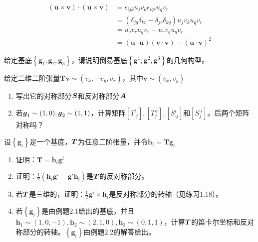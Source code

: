 \begin{exercise}
    \begin{align*}
        \left( \boldsymbol{u}\times \boldsymbol{v} \right) \cdot \left( \boldsymbol{u}\times \boldsymbol{v} \right) &=\epsilon _{ijk}u_jv_k\epsilon _{iqr}u_qv_r\\
        &=\left( \delta _{jq}\delta _{kr}-\delta _{jr}\delta _{kq} \right) u_jv_ku_qv_r\\
        &=u_qv_ru_qv_r-u_rv_qu_qv_r\\
        &=\left( \boldsymbol{u}\cdot \boldsymbol{u} \right) \left( \boldsymbol{v}\cdot \boldsymbol{v} \right) -\left( \boldsymbol{u}\cdot \boldsymbol{v} \right) ^2
    \end{align*}
    \item 给定基底$\left\{ \boldsymbol{g}_1,\boldsymbol{g}_2,\boldsymbol{g}_3 \right\} $，请说明倒易基底$\left\{ \boldsymbol{g}^1,\boldsymbol{g}^2,\boldsymbol{g}^3 \right\} $的几何构型。
    \item 给定二维二阶张量$\boldsymbol{Tv}\sim \left( v_x,-v_y,v_x \right) $，其中$\boldsymbol{v}\sim \left( v_x,v_y \right) $
    \begin{enumerate}
        \item 写出它的对称部分$\boldsymbol{S}$和反对称部分$\boldsymbol{A}$
        \item 若$\boldsymbol{g}_1\sim (1,0),\boldsymbol{g}_2\sim (1,1)$，计算矩阵$\left[ T_{\cdot j}^{i} \right] ,\left[ T_{j}^{\cdot i} \right] ,\left[ S_{\cdot j}^{i} \right] $和$\left[ S_{j}^{\cdot i} \right] $。后两个矩阵对称吗？
    \end{enumerate}
    \item 设$\left\{ \boldsymbol{g}_i \right\} $是一个基底，$\boldsymbol{T}$为任意二阶张量，并令$\boldsymbol{h}_i=\boldsymbol{Tg}_i$
    \begin{enumerate}
        \item 证明：$\boldsymbol{T}=\boldsymbol{h}_i\boldsymbol{g}^i$
        \item 证明：$\frac{1}{2}\left( \boldsymbol{h}_i\boldsymbol{g}^i-\boldsymbol{g}^i\boldsymbol{h}_i \right) $是$\boldsymbol{T}$的反对称部分。
        \item 若$\boldsymbol{T}$是三维的，证明：$\frac{1}{2}\boldsymbol{g}^i\times \boldsymbol{h}_i$是反对称部分的转轴（见练习1.18）。
        \item 若$\left\{ \boldsymbol{g}_i \right\} $是由例题2.1给出的基底，并且$\boldsymbol{h}_1\sim \left( 1,0,-1 \right) ,\boldsymbol{h}_2\sim \left( 2,1,0 \right) ,\boldsymbol{h}_3\sim \left( 0,1,1 \right) $，计算$\boldsymbol{T}$的笛卡尔坐标和反对称部分的转轴。$\left\{ \boldsymbol{g}_i \right\} $由例题2.2的解答给出。

\end{enumerate}
\end{exercise}
